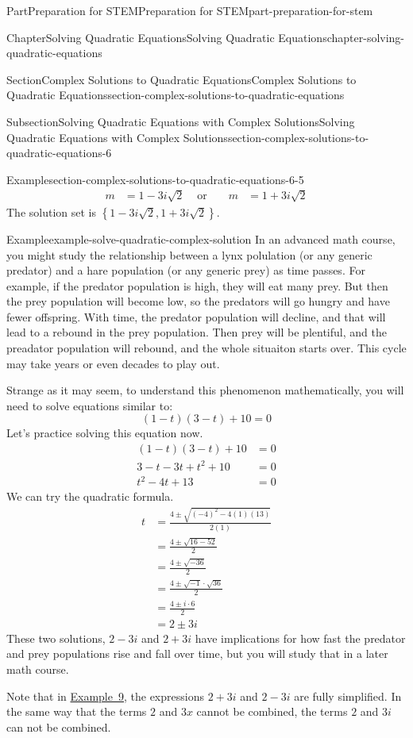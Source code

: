 \documentclass[twoside,10pt,]{book}
\numberwithin{equation}{section}
\newcommand{\amp}{&}
\begin{document}
\begin{partptx}{Part}{Preparation for STEM}{}{Preparation for STEM}{}{}{part-preparation-for-stem}
\begin{chapterptx}{Chapter}{Solving Quadratic Equations}{}{Solving Quadratic Equations}{}{}{chapter-solving-quadratic-equations}
\begin{sectionptx}{Section}{Complex Solutions to Quadratic Equations}{}{Complex Solutions to Quadratic Equations}{}{}{section-complex-solutions-to-quadratic-equations}
\begin{subsectionptx}{Subsection}{Solving Quadratic Equations with Complex Solutions}{}{Solving Quadratic Equations with Complex Solutions}{}{}{section-complex-solutions-to-quadratic-equations-6}
\begin{example}{Example}{}{section-complex-solutions-to-quadratic-equations-6-5}
{\begin{align*}
m\amp=1-3i\sqrt{2}\amp\text{ or }\amp\amp m\amp=1+3i\sqrt{2}
\end{align*}
The solution set is \(\left\{1-3i\sqrt{2}, 1+3i\sqrt{2}\right\}\).%
}\end{example}
\begin{example}{Example}{}{example-solve-quadratic-complex-solution}%
In an advanced math course, you might study the relationship between a lynx polulation (or any generic predator) and a hare population (or any generic prey) as time passes. For example, if the predator population is high, they will eat many prey. But then the prey population will become low, so the predators will go hungry and have fewer offspring. With time, the predator population will decline, and that will lead to a rebound in the prey population. Then prey will be plentiful, and the preadator population will rebound, and the whole situaiton starts over. This cycle may take years or even decades to play out.%
\par
Strange as it may seem, to understand this phenomenon mathematically, you will need to solve equations similar to:%
\begin{equation*}
(1-t)(3-t)+10=0
\end{equation*}
Let's practice solving this equation now.%
\begin{align*}
(1-t)(3-t)+10\amp=0\\
3-t-3t+t^2+10\amp=0\\
t^2-4t+13\amp=0
\end{align*}
We can try the quadratic formula.%
\begin{align*}
t\amp=\frac{4\pm\sqrt{(-4)^2-4(1)(13)}}{2(1)}\\
\amp=\frac{4\pm\sqrt{16-52}}{2}\\
\amp=\frac{4\pm\sqrt{-36}}{2}\\
\amp=\frac{4\pm\sqrt{-1}\cdot\sqrt{36}}{2}\\
\amp=\frac{4\pm i\cdot6}{2}\\
\amp=2\pm3i
\end{align*}
These two solutions, \(2-3i\) and \(2+3i\) have implications for how fast the predator and prey populations rise and fall over time, but you will study that in a later math course.%
\end{example}
Note that in \hyperref[example-solve-quadratic-complex-solution]{Example~9}, the expressions \(2+3i\) and \(2-3i\) are fully simplified. In the same way that the terms \(2\) and \(3x\) cannot be combined, the terms \(2\) and \(3i\) can not be combined.%

\end{subsectionptx}
\end{sectionptx}
\end{chapterptx}
\end{partptx}
\end{document}
